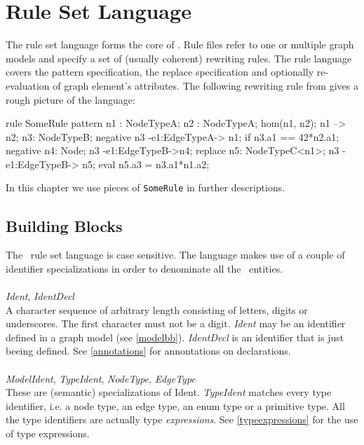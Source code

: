 \chapter{Rule Set Language}

The rule set language forms the core of \GrG. Rule files refer to one or multiple graph models and specify a set of (usually coherent) rewriting rules. The rule language covers the pattern specification, the replace specification and optionally re-evaluation of graph element's attributes. The following rewriting rule from \cite{geiss} gives a rough picture of the language:
\begin{grgen}
rule SomeRule {
  pattern {
    n1 : NodeTypeA;
    n2 : NodeTypeA;
    hom(n1, n2);
    n1 --> n2;
    n3: NodeTypeB;
    negative {
      n3 -e1:EdgeTypeA-> n1;
      if {n3.a1 == 42*n2.a1;}
    }
    negative {
      n4: Node\NodeTypeB;
      n3 -e1:EdgeTypeB->n4;
    }
  }
  replace {
    n5: NodeTypeC<n1>;
    n3 -e1:EdgeTypeB-> n5;
    eval {
      n5.a3 = n3.a1*n1.a2;
    }
  }  
}
\end{grgen}
In this chapter we use pieces of \texttt{SomeRule} in further descriptions.

\section{Building Blocks}
\label{rulebb}

The \GrG\ rule set language is case sensitive. The language makes use of a couple of identifier specializations in order to denominate all the \GrG\ entities.\\
\\
\emph{Ident}, \emph{IdentDecl}\\ \nopagebreak
A character sequence of arbitrary length consisting of letters, digits or underscores. The first character must not be a digit. \emph{Ident} may be an identifier defined in a graph model (see \ref{modelbb}). \emph{IdentDecl} is an identifier that is just beeing defined. See \ref{annotations} for annontations on declarations.\\
\\
\emph{ModelIdent}, \emph{TypeIdent}, \emph{NodeType}, \emph{EdgeType}\\
These are (semantic) specializations of Ident. \emph{TypeIdent} matches every type identifier, i.e. a node type, an edge type, an enum type or a primitive type. All the type identifiers are actually type \emph{expressions}. See \ref{typeexpressions} for the use of type expressions.\\


